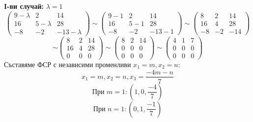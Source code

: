 \documentclass{article}
\begin{document}
\textbf{I-ви случай:} $\lambda=1$
\[
    \left(\begin{array}{ccc}
            9-\lambda & 2         & 14          \\
            16        & 5-\lambda & 28          \\
            -8        & -2        & -13-\lambda
        \end{array}
    \right)
    \sim\left(\begin{array}{ccc}
            9-1 & 2   & 14    \\
            16  & 5-1 & 28    \\
            -8  & -2  & -13-1
        \end{array}
    \right)
    \sim\left(\begin{array}{ccc}
            8  & 2  & 14  \\
            16 & 4  & 28  \\
            -8 & -2 & -14
        \end{array}
    \right)
\]
\[
    \sim\left(\begin{array}{ccc}
            8  & 2 & 14 \\
            16 & 4 & 28 \\
            0  & 0 & 0
        \end{array}
    \right)
    \sim\left(\begin{array}{ccc}
            8 & 2 & 14 \\
            0 & 0 & 0  \\
            0 & 0 & 0
        \end{array}
    \right)
    \sim\left(\begin{array}{ccc}
            4 & 1 & 7 \\
            0 & 0 & 0 \\
            0 & 0 & 0
        \end{array}
    \right)
\]
\newpage
Съставяме ФСР с независими променливи $x_1=m, x_2=n$:
\[
    x_1=m, x_2=n, x_3=\frac{-4m-n}{7}
\]
\[
    \text{При } m=1: (1, 0, \frac{-4}{7})
\]
\[
    \text{При } n=1: (0, 1, \frac{-1}{7})
\]
\end{document}
